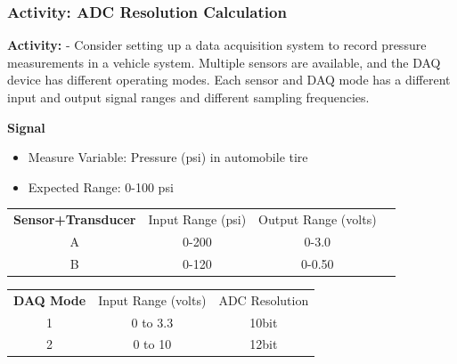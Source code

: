 \documentclass[fleqn]{beamer} %
\newcommand{\sectionIsubsectionIVtitle}{Activity: ADC Resolution Calculation}
\begin{document}
			\begin{frame}
				\frametitle{\sectionIsubsectionIVtitle} \scriptsize


				\textbf{Activity:} - Consider setting up a data acquisition system to record pressure measurements in a vehicle system. Multiple sensors are available, and the DAQ device has different operating modes. Each sensor and DAQ mode has a different input and output signal ranges and different sampling frequencies. \vspc
				
				
				\textbf{Signal}
				\begin{itemize}
					\item Measure Variable: Pressure (psi) in automobile tire 
					\item Expected Range:	0-100 psi 
				\end{itemize}
				\vspace*{2mm}
					\begin{tabular}{ cc c c}
						{\bf Sensor+Transducer} & Input Range (psi) & Output Range (volts)\\ 
						A & 0-200	& 0-3.0 \\
						B & 0-120  & 0-0.50 \\  
						   
					\end{tabular}
				\vspace*{2mm}
					\begin{tabular}{ c c c }
						{\bf DAQ Mode} & Input Range (volts) & ADC Resolution \\ 
						1 & 0 to 3.3	& 10bit \\
						2 & 0 to 10  & 12bit  \\  
						     
					\end{tabular}

			\end{frame}
\end{document}
